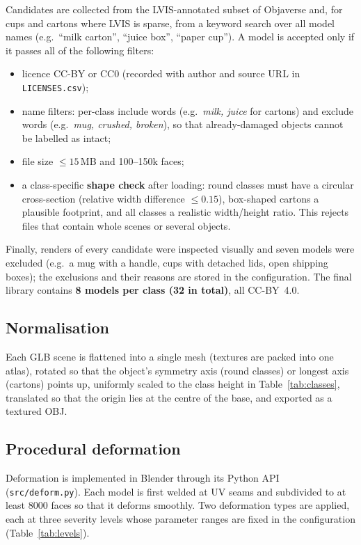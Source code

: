 \documentclass[11pt,a4paper]{article}
\newcommand{\code}[1]{\texttt{\small #1}}
\begin{document}
Candidates are collected from the LVIS-annotated subset of Objaverse and, for cups and cartons
where LVIS is sparse, from a keyword search over all model names (e.g.\ ``milk carton'',
``juice box'', ``paper cup''). A model is accepted only if it passes all of the following
filters:
\begin{itemize}
  \item licence CC-BY or CC0 (recorded with author and source URL in \code{LICENSES.csv});
  \item name filters: per-class include words (e.g.\ \emph{milk, juice} for cartons) and exclude
        words (e.g.\ \emph{mug, crushed, broken}), so that already-damaged objects cannot be
        labelled as intact;
  \item file size $\le 15$\,MB and 100--150k faces;
  \item a class-specific \textbf{shape check} after loading: round classes must have a circular
        cross-section (relative width difference $\le 0.15$), box-shaped cartons a plausible
        footprint, and all classes a realistic width/height ratio. This rejects files that
        contain whole scenes or several objects.
\end{itemize}
Finally, renders of every candidate were inspected visually and seven models were excluded
(e.g.\ a mug with a handle, cups with detached lids, open shipping boxes); the exclusions and
their reasons are stored in the configuration. The final library contains \textbf{8 models per
class (32 in total)}, all CC-BY~4.0.

\subsection{Normalisation}

Each GLB scene is flattened into a single mesh (textures are packed into one atlas), rotated so
that the object's symmetry axis (round classes) or longest axis (cartons) points up, uniformly
scaled to the class height in Table~\ref{tab:classes}, translated so that the origin lies at the
centre of the base, and exported as a textured OBJ.

\subsection{Procedural deformation}

Deformation is implemented in Blender through its Python API (\code{src/deform.py}). Each model
is first welded at UV seams and subdivided to at least 8000 faces so that it deforms smoothly.
Two deformation types are applied, each at three severity levels whose parameter ranges are fixed
in the configuration (Table~\ref{tab:levels}).
\end{document}
